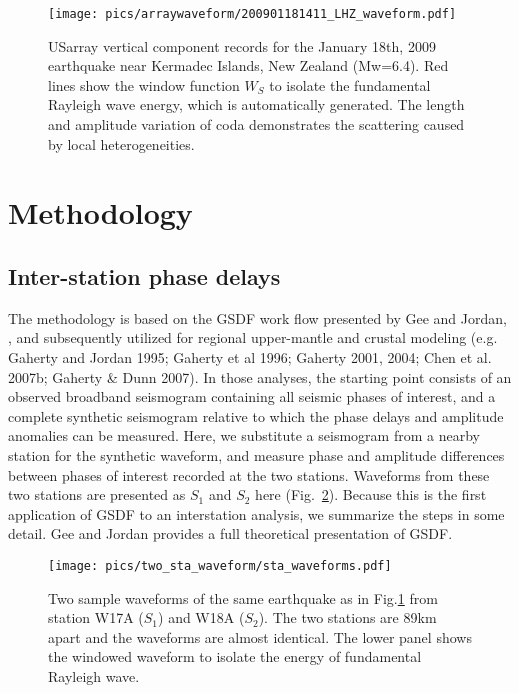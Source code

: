 \documentclass{gji}
\begin{document}
\begin{figure}
	\texttt{[image: pics/arraywaveform/200901181411\_LHZ\_waveform.pdf]}	
	\caption{USarray vertical component records for the January 18th, 2009 earthquake near Kermadec Islands, New Zealand (Mw=6.4). Red lines show the window function $W_S$ to isolate the fundamental Rayleigh wave energy, which is automatically generated. The length and amplitude variation of coda demonstrates the scattering caused by local heterogeneities.}
	\label{fig:arraywaveform}
\end{figure}

\section{Methodology}
\subsection{Inter-station phase delays}
\label{sec:gsdf}

The methodology is based on the GSDF work flow presented by Gee and Jordan, , and subsequently utilized for regional upper-mantle and crustal modeling (e.g. Gaherty and Jordan 1995; Gaherty et al 1996; Gaherty 2001, 2004; Chen et al. 2007b; Gaherty \& Dunn 2007).  In those analyses, the starting point consists of an observed broadband seismogram containing all seismic phases of interest, and a complete synthetic seismogram relative to which the phase delays and amplitude anomalies can be measured.  Here, we substitute a seismogram from a nearby station for the synthetic waveform, and measure phase and amplitude differences between phases of interest recorded at the two stations. Waveforms from these two stations are presented as $S_1$ and $S_2$ here (Fig.~\ref{fig:twostawaveform}). Because this is the first application of GSDF to an interstation analysis, we summarize the steps in some detail.  Gee and Jordan  provides a full theoretical presentation of GSDF. 

\begin{figure}
	\texttt{[image: pics/two\_sta\_waveform/sta\_waveforms.pdf]}
	\caption{Two sample waveforms of the same earthquake as in Fig.\ref{fig:arraywaveform} from station W17A ($S_1$) and W18A ($S_2$). The two stations are 89km apart and the waveforms are almost identical. The lower panel shows the windowed waveform to isolate the energy of fundamental Rayleigh wave.}
	\label{fig:twostawaveform}
\end{figure}
\end{document}
